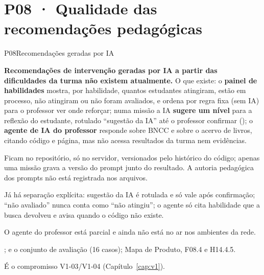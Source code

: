 \section{P08 · Qualidade das recomendações pedagógicas}
\label{sec:p08}

\begin{resposta}{P08}{Recomendações geradas por IA}{\naoexiste}
\begin{campos}
  \item[Hoje] \textbf{Recomendações de intervenção geradas por IA a partir das
    dificuldades da turma não existem atualmente.} O que existe: o
    \textbf{painel de habilidades} mostra, por habilidade, quantos estudantes
    atingiram, estão em processo, não atingiram ou não foram avaliados, e
    ordena por regra fixa (sem IA) para o professor ver onde reforçar; numa
    missão a IA \textbf{sugere um nível} para a reflexão do estudante,
    rotulado ``sugestão da IA'' até o professor confirmar ();
    o \textbf{agente de IA do professor} responde sobre BNCC e sobre o acervo
    de livros, citando código e página, mas não acessa resultados da turma
    nem evidências.
  \item[Prompts] Ficam no repositório, só no servidor, versionados pelo
    histórico do código; apenas uma missão grava a versão do prompt junto do
    resultado. A autoria pedagógica dos prompts não está registrada nos
    arquivos.
  \item[Observado $\times$ sugerido] Já há separação explícita: sugestão da IA
    é rotulada e só vale após confirmação; ``não avaliado'' nunca conta como
    ``não atingiu''; o agente só cita habilidade que a busca devolveu e avisa
    quando o código não existe.
  \item[Limitações] O agente do professor está parcial e ainda não está no ar
    nos ambientes da rede.
  \item[Evidência] ;
     e o conjunto de
    avaliação  (16 casos);
    Mapa de Produto, F08.4 e H14.4.5.
  \item[Lacuna] É o compromisso V1-03/V1-04 (Capítulo~\ref{cap:v1}).
\end{campos}
\end{resposta}

